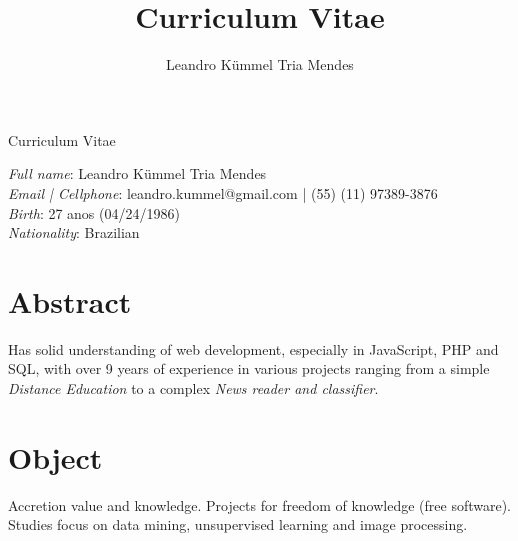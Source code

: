 \documentclass[a4paper,10pt]{article}
\title{Curriculum Vitae}
\author{Leandro Kümmel Tria Mendes}
\begin{document}
\begin{center} 
Curriculum Vitae
\end{center} 
\emph{Full name}: Leandro Kümmel Tria Mendes\\
\emph{Email | Cellphone}: leandro.kummel@gmail.com | (55) (11) 97389-3876\\
\emph{Birth}: 27 anos (04/24/1986)\\
\emph{Nationality}: Brazilian\\
\section{Abstract}
Has solid understanding of web development, especially in JavaScript, PHP and SQL, with over 9 years of experience in various projects ranging from a simple \emph{Distance Education} to a complex \emph{News reader and classifier}.
\section{Object}
Accretion value and knowledge. Projects for freedom of knowledge (free software).
Studies focus on data mining, unsupervised learning and image processing.
\end{document}
